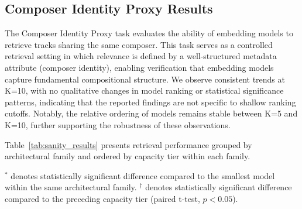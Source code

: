 \documentclass[sigconf]{acmart}
\begin{document}
\subsection{Composer Identity Proxy Results}
The Composer Identity Proxy task evaluates the ability of embedding models to retrieve tracks sharing the same composer. This task serves as a controlled retrieval setting in which relevance is defined by a well-structured metadata attribute (composer identity), enabling verification that embedding models capture fundamental compositional structure. We observe consistent trends at K=10, with no qualitative changes in model ranking or statistical significance patterns, indicating that the reported findings are not specific to shallow ranking cutoffs. Notably, the relative ordering of models remains stable between K=5 and K=10, further supporting the robustness of these observations.

Table~\ref{tab:sanity_results} presents retrieval performance grouped by architectural family and ordered by capacity tier within each family.

\begin{table}[!htbp]
\centering
\caption{Composer Identity Proxy Results (Composer Retrieval). Metrics reported are corpus-level mean values at rank 5 and rank 10, including NDCG@K and Hit Rate@K (HR@K).}
\label{tab:sanity_results}
\vspace{2pt}
\raggedright
\footnotesize{
$^{*}$ denotes statistically significant difference compared to the smallest model within the same architectural family.
$^{\dagger}$ denotes statistically significant difference compared to the preceding capacity tier (paired t-test, $p < 0.05$).
}
\end{table}
\end{document}
